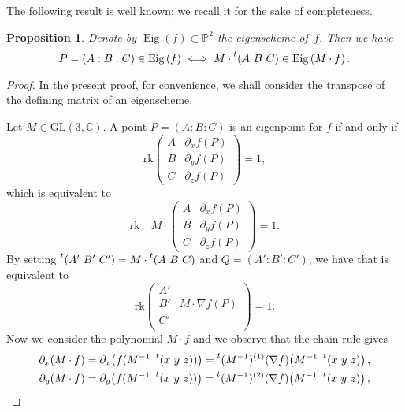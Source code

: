 \documentclass[12pt, a4paper, reqno, captions=tableheading,bibliography=totoc]{scrartcl}
\theoremstyle{plain}
\newtheorem{prop}[lemma]{Proposition}
\theoremstyle{definition}
\newcommand{\C}{\mathbb{C}}
\newcommand{\p}{\mathbb{P}}
\newcommand{\de}{\partial}
\newcommand{\Eig}[1]{\operatorname{Eig}\left( {#1} \right)}
\begin{document}
The following result is well known; we recall it for the sake of completeness.

\begin{prop}
 Denote by $\Eig{f} \subset \p^2$ the eigenscheme of~$f$.
 Then we have
 \[
  P = (A: B: C) \in \Eig{f} \iff M \cdot \prescript{t} {}(A \ B \ C) \in \Eig{M \cdot f}.
 \]
\end{prop}


\begin{proof}
In the present proof,
for convenience, we shall consider the transpose of the defining matrix of an eigenscheme.

Let $M \in \mathrm{GL}(3, \C)$.
A point $P=(A: B: C)$ is an eigenpoint for $f$ if and only if
\begin{equation*}
  \text  {rk}  \begin{pmatrix}
    A & \de_x f(P) \\
    B & \de_y f(P)  \\
    C & \de_z f(P)
    \end{pmatrix}=1,
\end{equation*}
which is equivalent to
\begin{equation}
\label{eq:def_matrix_M}
    \text  {rk} \quad  M  \cdot \begin{pmatrix}
    A & \de_x f(P) \\
    B & \de_y f(P)  \\
    C & \de_z f(P)
    \end{pmatrix}
    =1.
\end{equation}
By setting $\prescript{t} {}(A' \ B' \ C' )= M \cdot \prescript{t} {}(A \ B \ C) $ and $Q=(A':B':C')$, we have that 
is equivalent to
\begin{equation}
\label{eq:transformed}
  \text{rk}
  \begin{pmatrix}
    A' &  \\
    B' & M \cdot \nabla f (P) \\
    C' & \\
  \end{pmatrix}=1.
\end{equation}
Now we consider the polynomial $M \cdot f$ and we observe that the chain rule gives
\begin{gather*}
\partial_x (M\cdot f) = \partial_x \bigl( f(M^{-1}  \ \prescript{t} {} (x \ y \ z)) \bigr) = \prescript{t} {}(M^{-1})^{(1)}(\nabla f) \bigl( M^{-1}\   \prescript{t} {} (x \ y \ z) \bigr) \,, \\
\partial_y (M\cdot f) = \partial_y \bigl( f(M^{-1}  \ \prescript{t} {} (x \ y \ z)) \bigr) = \prescript{t} {}(M^{-1})^{(2)}(\nabla f) \bigl( M^{-1}\   \prescript{t} {} (x \ y \ z) \bigr) \,, \\

\end{gather*}
\end{proof}
\end{document}

